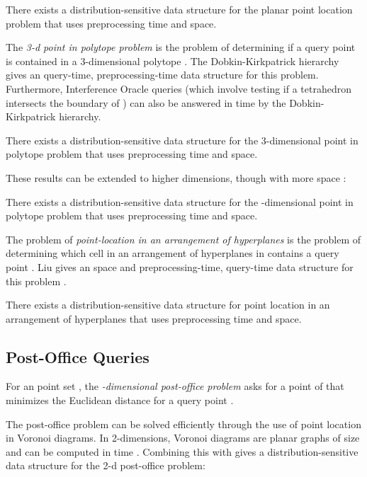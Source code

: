 \documentclass{patmorin}
\begin{document}
\begin{thm}
  There exists a distribution-sensitive data structure for the planar
  point location problem that uses  preprocessing time and
   space.
\end{thm}

The \emph{3-d point in polytope problem} is the problem of determining if
a query point  is contained in a 3-dimensional polytope .
The Dobkin-Kirkpatrick hierarchy \cite{dk83} gives an 
query-time,  preprocessing-time data structure for this problem.
Furthermore, Interference Oracle queries (which involve testing if a
tetrahedron intersects the boundary of ) can also be answered in  time by the Dobkin-Kirkpatrick hierarchy.

\begin{thm}
  There exists a distribution-sensitive data structure for the
  3-dimensional point in polytope problem that uses  preprocessing
  time and space.
\end{thm}

These results can be extended to higher dimensions, though with more
space \cite{c88}:

\begin{thm}
  There exists a distribution-sensitive data structure for
  the -dimensional point in polytope problem that uses
   preprocessing time and space.
\end{thm}

The problem of \emph{point-location in an arrangement of hyperplanes} is
the problem of determining which cell in an arrangement of  hyperplanes
in  contains a query point .  Liu gives an 
space and preprocessing-time,  query-time data structure for
this problem \cite{l04}.

\begin{thm}
  There exists a distribution-sensitive data structure for point location
  in an arrangement of hyperplanes that uses  preprocessing time
  and space.
\end{thm}

\subsection{Post-Office Queries}

For an  point set , the \emph{-dimensional post-office
problem} asks for a point of  that minimizes the Euclidean
distance  for a query point .

The post-office problem can be solved efficiently through the use of
point location in Voronoi diagrams.  In 2-dimensions, Voronoi diagrams
are planar graphs of size  and can be computed in  time
\cite{ps85}.  Combining this with  gives
a distribution-sensitive data structure for the 2-d post-office problem:
\end{document}
